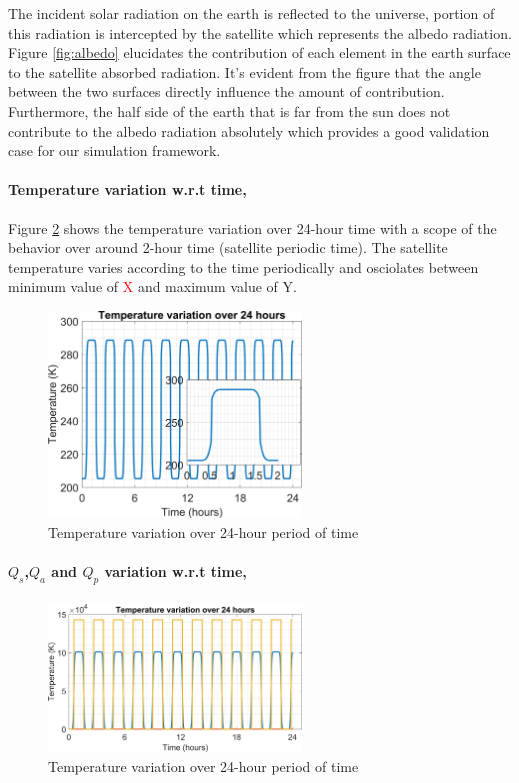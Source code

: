 \documentclass[11pt]{article}
\begin{document}
The incident solar radiation on the earth is reflected to the universe, portion of this radiation is intercepted by the satellite which represents the albedo radiation. Figure \ref{fig:albedo} elucidates the contribution of each element in the earth surface to the satellite absorbed radiation. It's evident from the figure that the angle between the two surfaces directly influence the amount of contribution. Furthermore, the half side of the earth that is far from the sun does not contribute to the albedo radiation absolutely which provides a good validation case for our simulation framework. 

 \newpage

\paragraph{Temperature variation w.r.t time,}
Figure \ref{fig:temptime} shows the temperature variation over 24-hour time with a scope of the behavior over around 2-hour time (satellite periodic time). The satellite temperature varies according to the time periodically and osciolates between minimum value of \textcolor{red}{X} and maximum value of Y.  

\begin{figure}[h]
    \centering
    \includegraphics[width=0.6\textwidth]{Matlab/images/temp_time.png}
    \caption{Temperature variation over 24-hour period of time}
    \label{fig:temptime}
\end{figure}



\paragraph{$Q_{s}$,$Q_{a}$ and $Q_{p}$ variation w.r.t time,}


\begin{figure}[h]
    \centering
    \includegraphics[width=0.6\textwidth]{Matlab/images/QQQ_time.png}
    \caption{Temperature variation over 24-hour period of time}
    \label{fig:temptime}
\end{figure}
\end{document}
